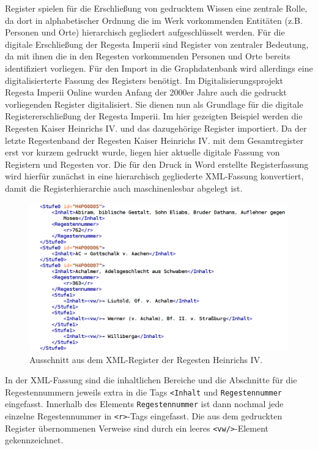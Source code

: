 \documentclass[ngerman,]{scrreprt}
\begin{document}
Register spielen für die Erschließung von gedrucktem Wissen eine zentrale Rolle, da dort in alphabetischer Ordnung die im Werk vorkommenden Entitäten (z.B. Personen und Orte) hierarchisch gegliedert aufgeschlüsselt werden. Für die digitale Erschließung der Regesta Imperii sind Register von zentraler Bedeutung, da mit ihnen die in den Regesten vorkommenden Personen und Orte bereits identifiziert vorliegen. Für den Import in die Graphdatenbank wird allerdings eine digitalisierterte Fassung des Registers benötigt. Im Digitalisierungsprojekt Regesta Imperii Online wurden Anfang der 2000er Jahre auch die gedruckt vorliegenden Register digitalisiert. Sie dienen nun als Grundlage für die digitale Registererschließung der Regesta Imperii. Im hier gezeigten Beispiel werden die Regesten Kaiser Heinrichs IV. und das dazugehörige Register importiert. Da der letzte Regestenband der Regesten Kaiser Heinrichs IV. mit dem Gesamtregister erst vor kurzem gedruckt wurde, liegen hier aktuelle digitale Fassung von Registern und Regesten vor. Die für den Druck in Word erstellte Registerfassung wird hierfür zunächst in eine hierarchisch gegliederte XML-Fassung konvertiert, damit die Registerhierarchie auch maschinenlesbar abgelegt ist.

\begin{figure}
\centering
\includegraphics{Bilder/RI2Graph/XML-Register.png}
\caption{Ausschnitt aus dem XML-Register der Regesten Heinrichs IV.}
\end{figure}

In der XML-Fassung sind die inhaltlichen Bereiche und die Abschnitte für die Regestennummern jeweils extra in die Tags \texttt{\textless{}Inhalt} und \texttt{Regestennummer} eingefasst. Innerhalb des Elements \texttt{Regestennummer} ist dann nochmal jede einzelne Regestennummer in \texttt{\textless{}r\textgreater{}}-Tags eingefasst. Die aus dem gedruckten Register übernommenen Verweise sind durch ein leeres \texttt{\textless{}vw/\textgreater{}}-Element gekennzeichnet.
\end{document}
